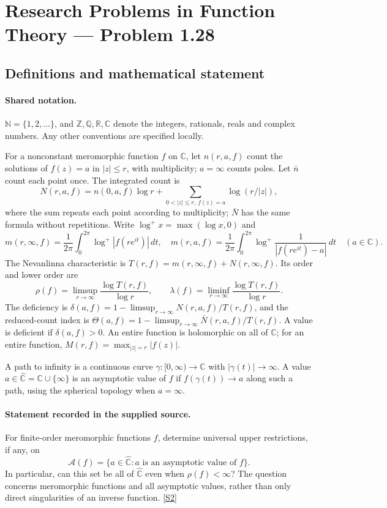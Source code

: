 \documentclass[11pt]{article}
\newcommand{\sref}[2]{\hyperlink{source:#1:#2}{[S#2]}}
\begin{document}
\section{Research Problems in Function Theory — Problem 1.28}\label{statement}

\subsection{Definitions and mathematical statement}

\paragraph{Shared notation.}$\mathbb N=\{1,2,\ldots\}$, and $\mathbb Z,\mathbb Q,\mathbb R,\mathbb C$ denote the integers, rationals, reals and complex numbers. Any other conventions are specified locally.


For a nonconstant meromorphic function $f$ on $\mathbb C$, let $n(r,a,f)$ count the solutions of $f(z)=a$ in $|z|\le r$, with multiplicity; $a=\infty$ counts poles. Let $\bar n$ count each point once. The integrated count is
\[
 N(r,a,f)=n(0,a,f)\log r+\sum_{0<|z|\le r,\ f(z)=a}\log(r/|z|),
\]
where the sum repeats each point according to multiplicity; $\bar N$ has the same formula without repetitions. Write $\log^+x=\max(\log x,0)$ and
\[
 m(r,\infty,f)=\frac1{2\pi}\int_0^{2\pi}\log^+|f(re^{it})|\,dt,\quad
 m(r,a,f)=\frac1{2\pi}\int_0^{2\pi}\log^+\frac1{|f(re^{it})-a|}\,dt\quad(a\in\mathbb C).
\]
The Nevanlinna characteristic is $T(r,f)=m(r,\infty,f)+N(r,\infty,f)$. Its order and lower order are
\[
 \rho(f)=\limsup_{r\to\infty}\frac{\log T(r,f)}{\log r},\qquad
 \lambda(f)=\liminf_{r\to\infty}\frac{\log T(r,f)}{\log r}.
\]
The deficiency is $\delta(a,f)=1-\limsup_{r\to\infty}N(r,a,f)/T(r,f)$, and the reduced-count index is $\Theta(a,f)=1-\limsup_{r\to\infty}\bar N(r,a,f)/T(r,f)$. A value is deficient if $\delta(a,f)>0$. An entire function is holomorphic on all of $\mathbb C$; for an entire function, $M(r,f)=\max_{|z|=r}|f(z)|$.

A path to infinity is a continuous curve $\gamma:[0,\infty)\to\mathbb C$ with $|\gamma(t)|\to\infty$. A value $a\in\widehat{\mathbb C}=\mathbb C\cup\{\infty\}$ is an asymptotic value of $f$ if $f(\gamma(t))\to a$ along such a path, using the spherical topology when $a=\infty$.
\paragraph{Statement recorded in the supplied source.}
For finite-order meromorphic functions $f$, determine universal upper restrictions, if any, on
\[
 \mathcal A(f)=\{a\in\widehat{\mathbb C}:a\text{ is an asymptotic value of }f\}.
\]
In particular, can this set be all of $\widehat{\mathbb C}$ even when $\rho(f)<\infty$? The question concerns meromorphic functions and all asymptotic values, rather than only direct singularities of an inverse function. \sref{statement}{2}
\end{document}
